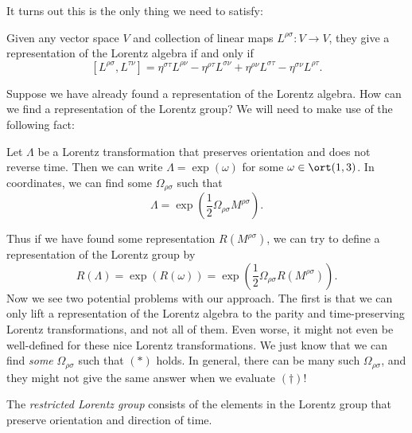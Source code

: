 \documentclass[a4paper]{article}
\begin{document}
It turns out this is the only thing we need to satisfy:
\begin{fact}
  Given any vector space $V$ and collection of linear maps $L^{\rho\sigma}: V \to V$, they give a representation of the Lorentz algebra if and only if
  \[
    [L^{\rho\sigma}, L^{\tau\nu}] = \eta^{\sigma\tau} L^{\rho\nu} - \eta^{\rho\tau} L^{\sigma\nu} + \eta^{\rho\nu}L^{\sigma\tau} - \eta^{\sigma\nu}L^{\rho\tau}.
  \]
\end{fact}
Suppose we have already found a representation of the Lorentz algebra. How can we find a representation of the Lorentz group? We will need to make use of the following fact:
\begin{fact}
  Let $\Lambda$ be a Lorentz transformation that preserves orientation and does not reverse time. Then we can write $\Lambda = \exp(\omega)$ for some $\omega \in \ort(1, 3)$. In coordinates, we can find some $\Omega_{\rho\sigma}$ such that
  \[
    \Lambda = \exp\left(\frac{1}{2} \Omega_{\rho\sigma} M^{\rho\sigma}\right).\tag{$*$}
  \]
\end{fact}
Thus if we have found some representation $R(M^{\rho\sigma})$, we can try to define a representation of the Lorentz group by
\[
  R(\Lambda) = \exp(R(\omega)) = \exp \left(\frac{1}{2} \Omega_{\rho\sigma} R(M^{\rho\sigma})\right).\tag{$\dagger$}
\]
Now we see two potential problems with our approach. The first is that we can only lift a representation of the Lorentz algebra to the parity and time-preserving Lorentz transformations, and not all of them. Even worse, it might not even be well-defined for these nice Lorentz transformations. We just know that we can find \emph{some} $\Omega_{\rho\sigma}$ such that $(*)$ holds. In general, there can be many such $\Omega_{\rho\sigma}$, and they might not give the same answer when we evaluate $(\dagger)$!

\begin{defi}
  The \emph{restricted Lorentz group} consists of the elements in the Lorentz group that preserve orientation and direction of time.
\end{defi}
\end{document}
